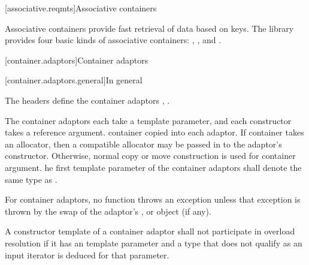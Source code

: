 \setcounter{subsection}{6}

\noindent\makebox[\linewidth]{\rule{\textwidth}{0.4pt}}

[associative.reqmts]{Associative containers}

\pnum
Associative containers provide fast retrieval of data based on keys.
The library provides four basic kinds of associative containers:
,
,
and
.

\setcounter{chapter}{21}
\setcounter{section}{5}
[container.adaptors]{Container adaptors}

[container.adaptors.general]{In general}

\pnum
The headers   define the container adaptors ,
 .

\pnum
The container adaptors each take a  template parameter, and
each constructor takes a  reference argument.  container copied into
each adaptor. If  container takes an allocator, then a compatible allocator may be passed in
to the adaptor's constructor. Otherwise, normal copy or move construction is
used for container argument.  he first template
parameter  of the container adaptors shall denote the same type
as .

\pnum
For container adaptors, no  function throws an exception unless
that exception is thrown by the swap of the
adaptor's , or
 object (if any).

\pnum
A constructor template of a container adaptor
shall not participate in overload resolution
if it has an  template parameter and
a type that does not qualify as an input iterator is deduced for that parameter.


